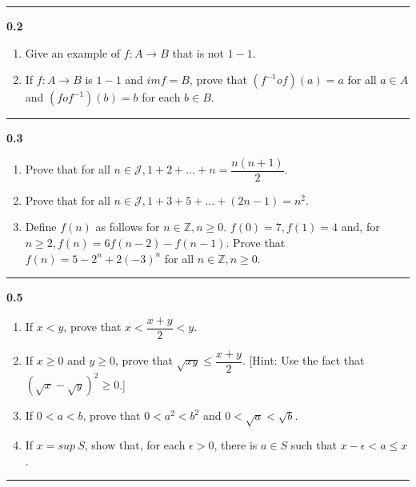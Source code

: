 \documentclass[fleqn]{article}
\begin{document}
  \rule{15cm}{2pt}

  \textbf{0.2}
  \begin{enumerate}
    \item Give an example of $f: A \rightarrow B$ that is not $1-1$.

    \item If $f: A \rightarrow B$ is $1-1$ and $im f=B$, prove that $(f^{-1}of)(a)=a$
    for all $a \in A$ and $(fof^{-1})(b)=b$ for each $b \in B$.
  \end{enumerate}

  \rule{15cm}{2pt}

  \textbf{0.3}
  \begin{enumerate}
    \item Prove that for all $n \in \mathcal{J}, 1+2+...+n=\dfrac{n(n+1)}{2}$.

    \item Prove that for all $n \in \mathcal{J}, 1+3+5+...+(2n-1)=n^2$.

    \item Define $f(n)$ as follows for $n \in \mathbb{Z}, n\geqslant 0$. $f(0)=7, f(1)=4$ 
    and, for $n \geqslant 2, f(n)=6f(n-2)-f(n-1)$. Prove that $f(n)=5-2^n+2(-3)^n$ for 
    all $n \in \mathbb{Z}, n \geqslant 0$.
  \end{enumerate}

  \rule{15cm}{2pt}

  \textbf{0.5}
  \begin{enumerate}
    \item If $x < y$, prove that $x < \dfrac{x+y}{2} < y$.

    \item If $x \geq 0$ and $y \geq 0$, prove that $\sqrt{xy} \leq \dfrac{x+y}{2}$. 
    [Hint: Use the fact that $\left(\sqrt{x}-\sqrt{y}\right)^2 \geqslant 0$.]

    \item If $0 < a < b$, prove that $0 < a^2 < b^2$ and $0 < \sqrt{a} < \sqrt{b}$.

    \item If $x=sup ~ S$, show that, for each $\epsilon > 0$, there is $a \in S$ such that
    $x-\epsilon < a \leq x$.
  \end{enumerate}

  \rule{15cm}{2pt}
\end{document}
